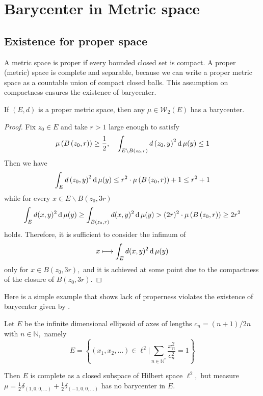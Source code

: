 \chapter{Barycenter in Metric space}
\label{chapter:metric_space}
\section{Existence for proper space}

A metric space is proper if every bounded closed set is compact.
A proper (metric) space is complete and separable,
because we can write a proper metric space as a countable union of compact closed balls.
This assumption on compactness ensures the existence of barycenter.

\begin{prop}
	\label{lem:existence_proper_space}
	If \( ( E , d ) \) is a proper metric space, then any \( \mu \in \mathcal{W}_ { 2 } ( E ) \) has a barycenter.
\end{prop}

\begin{proof}
	Fix \( z _ { 0 } \in E \) and take \( r > 1 \) large enough to satisfy
	\[ \mu \left( B \left( z _ { 0 } , r \right) \right) \geq \frac { 1 } { 2 } , \quad \int _ { E \backslash B \left( z _ { 0 } , r \right) } d \left( z _ { 0 } , y \right) ^ { 2 } \operatorname{d} \mu ( y ) \leq 1 \]
	Then we have
	\[ \int _ { E } d \left( z _ { 0 } , y \right) ^ { 2 } \operatorname{d} \mu ( y ) \leq r ^ { 2 } \cdot \mu \left( B \left( z _ { 0 } , r \right) \right) + 1 \leq r ^ { 2 } + 1 \]
	while for every \( x \in E \backslash B \left( z _ { 0 } , 3 r \right) \)
	\[ \int _ { E } d ( x , y ) ^ { 2 } \operatorname{d} \mu ( y ) \geq \int _ { B \left( z _ { 0 } , r \right) } d ( x , y ) ^ { 2 } \operatorname{d} \mu ( y ) > ( 2 r ) ^ { 2 } \cdot \mu \left( B \left( z _ { 0 } , r \right) \right) \geq 2 r ^ { 2 } \]
	holds.
	Therefore, it is sufficient to consider the infimum of
	\[ x \longmapsto \int _ { E } d ( x , y ) ^ { 2 } \operatorname{d} \mu ( y ) \]
	only for \( x \in B \left( z _ { 0 } , 3 r \right) , \) and it is achieved at some point due to the compactness of the closure of \( B \left( z _ { 0 } , 3 r \right) . \)
\end{proof}

Here is a simple example that shows lack of properness
violates the existence of barycenter given by \cite[Example 3.1 (a)]{ohta2012barycenters}.

\begin{example}
	\label{example:ellipsoid_subspace}
	Let \( E \) be the infinite dimensional ellipsoid of axes of lengths \( c _ { n } = ( n + 1 ) / 2 n \) with \( n \in \mathbb { N } , \) namely
	\[
		E = \left\{ \left( x _ { 1 } , x _ { 2 } , \ldots \right) \in \ell^2 | \sum _ { n \in \mathbb { N }^* } \frac { x _ { n } ^ { 2 } } { c _ { n } ^ { 2 } } = 1 \right\}
	\]

	Then \( E \) is complete as a closed subspace of Hilbert space $\ell^2,$
	but measure $\mu = \frac{1}{2}\delta _ { ( 1,0,0 , \ldots ) } + \frac{1}{2} \delta _ { ( - 1,0,0 , \ldots ) } $  has no barycenter in \( E \).
\end{example}

